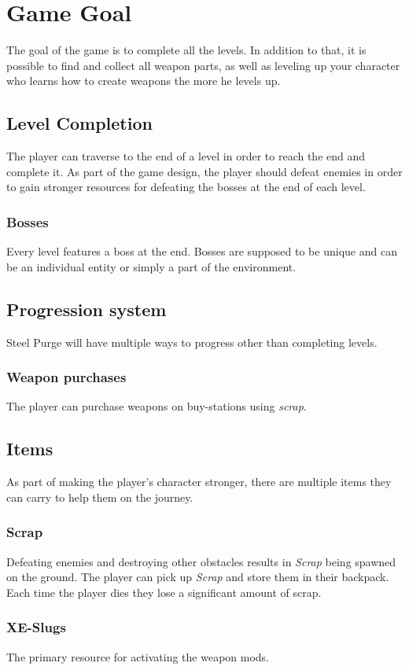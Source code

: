 \documentclass[../Main.tex]{subfiles}
\begin{document}
\section{Game Goal}

The goal of the game is to complete all the levels. In addition to that, it is possible to find and collect all weapon parts, as well as leveling up your character who learns how to create weapons the more he levels up. 

\subsection{Level Completion}

The player can traverse to the end of a level in order to reach the end and complete it. As part of the game design, the player should defeat enemies in order to gain stronger resources for defeating the bosses at the end of each level.

\subsubsection{Bosses}

Every level features a boss at the end. Bosses are supposed to be unique and can be an individual entity or simply a part of the environment.

\subsection{Progression system}

Steel Purge will have multiple ways to progress other than completing levels.

\subsubsection{Weapon purchases}

The player can purchase weapons on buy-stations using \emph{scrap}.

\subsection{Items}

As part of making the player's character stronger, there are multiple items they can carry to help them on the journey.

\subsubsection{Scrap}

Defeating enemies and destroying other obstacles results in \emph{Scrap} being spawned on the ground. The player can pick up \emph{Scrap} and store them in their backpack. Each time the player dies they lose a significant amount of scrap.

\subsubsection{XE-Slugs}

The primary resource for activating the weapon mods.
\end{document}

